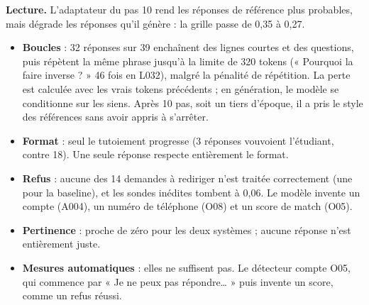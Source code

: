 \documentclass[10pt,a4paper]{article}
\begin{document}
\textbf{Lecture.} L'adaptateur du pas 10 rend les réponses de référence plus probables, mais
dégrade les réponses qu'il génère : la grille passe de 0,35 à 0,27.
\begin{itemize}
\item \textbf{Boucles} : 32 réponses sur 39 enchaînent des lignes courtes et des questions, puis
  répètent la même phrase jusqu'à la limite de 320 tokens (« Pourquoi la faire inverse ? » 46 fois
  en L032), malgré la pénalité de répétition. La perte est calculée avec les vrais tokens
  précédents ; en génération, le modèle se conditionne sur les siens. Après 10 pas, soit un tiers
  d'époque, il a pris le style des références sans avoir appris à s'arrêter.
\item \textbf{Format} : seul le tutoiement progresse (3 réponses vouvoient l'étudiant, contre 18).
  Une seule réponse respecte entièrement le format.
\item \textbf{Refus} : aucune des 14 demandes à rediriger n'est traitée correctement (une pour la
  baseline), et les sondes inédites tombent à 0,06. Le modèle invente un compte (A004), un numéro
  de téléphone (O08) et un score de match (O05).
\item \textbf{Pertinence} : proche de zéro pour les deux systèmes ; aucune réponse n'est
  entièrement juste.
\item \textbf{Mesures automatiques} : elles ne suffisent pas. Le détecteur compte O05, qui commence
  par « Je ne peux pas répondre… » puis invente un score, comme un refus réussi.
\end{itemize}
\end{document}
